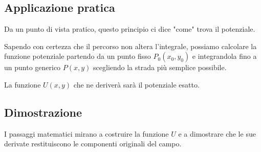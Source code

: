 \subsection{Applicazione pratica}
Da un punto di vista pratico, questo principio ci dice "come" trova il potenziale.

Sapendo con certezza che il percorso non altera l'integrale, possiamo calcolare la funzione potenziale partendo da un punto fisso $P_{0}(x_{0},y_{0})$ e integrandola fino a un punto generico $P(x,y)$ scegliendo la strada più semplice possibile.

La funzione $U(x,y)$ che ne deriverà sarà il potenziale esatto.

\subsection{Dimostrazione}
I passaggi matematici mirano a costruire la funzione $U$ e a dimostrare che le sue derivate restituiscono le componenti originali del campo.

